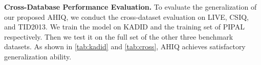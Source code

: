 \documentclass[10pt,twocolumn,letterpaper]{article}
\begin{document}
\vspace{2pt}
\noindent\textbf{Cross-Database Performance Evaluation.} 
To evaluate the generalization of our proposed AHIQ, we conduct the cross-dataset evaluation on LIVE, CSIQ, and TID2013. We train the model on KADID and the training set of PIPAL respectively. Then we test it on the full set of the other three benchmark datasets. As shown in \cref{tab:kadid} and \cref{tab:cross}, AHIQ achieves satisfactory generalization ability. 

\begin{table}[th]
\centering
\caption{Performance comparison for cross-database evaluations.}
\label{tab:cross}
\end{table}
\end{document}
